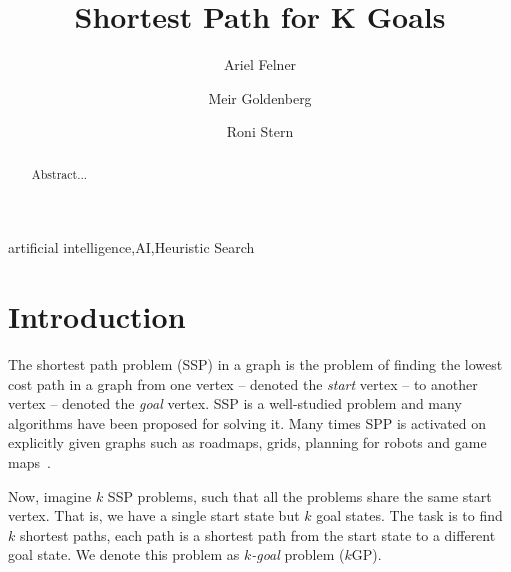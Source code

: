 \documentclass{aicom2e}
\newcommand{\kgs}{$k$GP}
\begin{document}
\begin{frontmatter}                           %
%
\title{Shortest Path for K Goals}
\maketitle
%
\author[]{Ariel Felner}
\address{Ben Gurion University of the Negev\\ Be'er Sheva, Israel\\
    E-mail: felner@bgu.ac.il}

\author[]{Meir Goldenberg}
\address{The Jerusalem College of Technology\\ Jerusalem, Israel\\
    E-mail: mgoldenbe@gmail.com}
\author[]{Roni Stern}
\address{Ben Gurion University of the Negev\\ Be'er Sheva, Israel\\
    E-mail: roni.stern@gmail.com}

\begin{abstract}
Abstract...

\end{abstract}

\begin{keyword}
artificial intelligence\sep AI\sep Heuristic Search
\end{keyword}
%
\end{frontmatter}

\section*{Introduction}



The shortest path problem (SSP) in a graph is the problem of finding the lowest
cost path in a graph from one vertex -- denoted the {\em start} vertex -- to
another vertex -- denoted the {\em goal} vertex. SSP is a well-studied problem
and many algorithms have been proposed for solving it. Many times SPP is
activated on explicitly given graphs such as roadmaps, grids, planning for
robots and game maps~\cite{sturtevant2012benchmarks}.

Now, imagine $k$ SSP problems, such that all the problems share the same start
vertex. That is, we have a single start state but $k$ goal states. The task is
to find $k$ shortest paths, each path is a shortest path from the start state
to a different goal state. We denote this problem as {\em $k$-goal} problem (\kgs{}).
\end{document}

